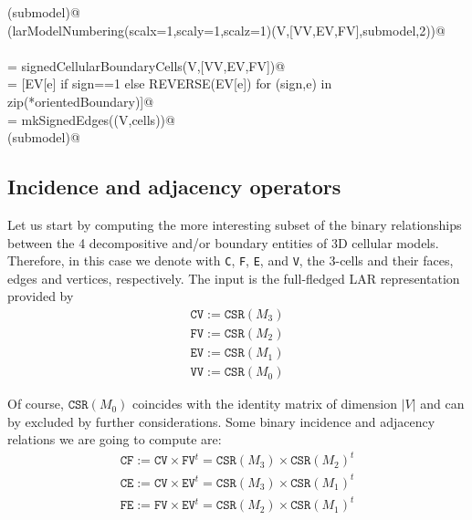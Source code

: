 \documentclass[11pt,oneside]{article}	%
\begin{document}
\begin{flushleft}
\begin{list}{}{}
\mbox{}\verb@VIEW(submodel)@\\
\mbox{}\verb@VIEW(larModelNumbering(scalx=1,scaly=1,scalz=1)(V,[VV,EV,FV],submodel,2))@\\
\mbox{}\verb@@\\
\mbox{}\verb@orientedBoundary = signedCellularBoundaryCells(V,[VV,EV,FV])@\\
\mbox{}\verb@cells = [EV[e] if sign==1 else REVERSE(EV[e]) for (sign,e) in zip(*orientedBoundary)]@\\
\mbox{}\verb@submodel = mkSignedEdges((V,cells))@\\
\mbox{}\verb@VIEW(submodel)@\\
\mbox{}\verb@@{\NWsep}
\end{list}
\vspace{-2ex}
\end{flushleft}


\subsection{Incidence and adjacency operators}

Let us start by computing the more interesting subset of the binary relationships between the 4 decompositive and/or boundary entities of 3D cellular models.  Therefore, in this case we denote with \texttt{C}, \texttt{F}, \texttt{E}, and \texttt{V}, the 3-cells and their faces, edges and vertices, respectively.
The input is the full-fledged LAR representation provided by 
\begin{align}
\texttt{CV} := \texttt{CSR}(M_3) \\
\texttt{FV} := \texttt{CSR}(M_2) \\
\texttt{EV} := \texttt{CSR}(M_1) \\
\texttt{VV} := \texttt{CSR}(M_0) 
\end{align}

Of course, $\texttt{CSR}(M_0)$ coincides with the identity matrix of dimension $|V|$ and can by excluded by further considerations.
Some binary incidence and adjacency relations we are going to compute are:
\begin{align}
\texttt{CF} := \texttt{CV} \times \texttt{FV}^t = \texttt{CSR}(M_3)\times\texttt{CSR}(M_2)^t \\
\texttt{CE} := \texttt{CV} \times \texttt{EV}^t = \texttt{CSR}(M_3)\times\texttt{CSR}(M_1)^t \\
\texttt{FE} := \texttt{FV} \times \texttt{EV}^t = \texttt{CSR}(M_2)\times\texttt{CSR}(M_1)^t 
\end{align}
\end{document}
